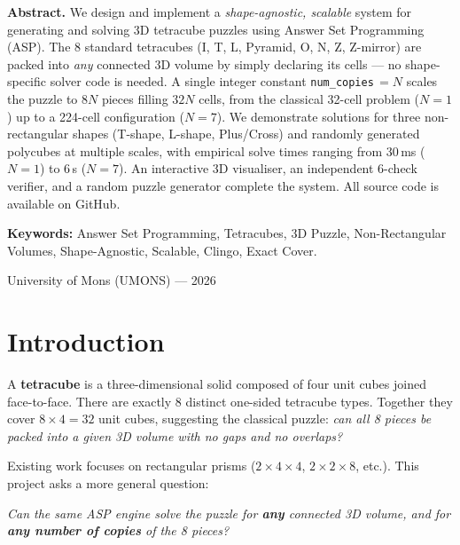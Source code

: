 \documentclass[12pt,a4paper]{article}
\begin{document}
\begin{titlepage}
  \begin{abstractbox}
    \textbf{Abstract.}
    We design and implement a \emph{shape-agnostic, scalable} system for
    generating and solving 3D tetracube puzzles using Answer Set Programming
    (ASP).  The 8 standard tetracubes (I, T, L, Pyramid, O, N, Z, Z-mirror)
    are packed into \emph{any} connected 3D volume by simply declaring its
    cells --- no shape-specific solver code is needed.  A single integer
    constant \texttt{num\_copies}\,$=N$ scales the puzzle to $8N$ pieces
    filling $32N$ cells, from the classical 32-cell problem ($N=1$) up to
    a 224-cell configuration ($N=7$).  We demonstrate solutions for three
    non-rectangular shapes (T-shape, L-shape, Plus/Cross) and randomly
    generated polycubes at multiple scales, with empirical solve times
    ranging from 30\,ms ($N=1$) to 6\,s ($N=7$).  An interactive 3D
    visualiser, an independent 6-check verifier, and a random puzzle
    generator complete the system.  All source code is available on GitHub.

    \vspace{4pt}
    \textbf{Keywords:} Answer Set Programming, Tetracubes, 3D Puzzle,
    Non-Rectangular Volumes, Shape-Agnostic, Scalable, Clingo, Exact Cover.
  \end{abstractbox}

  \vfill
  {\small\color{gray} University of Mons (UMONS) --- 2026}
\end{titlepage}

\tableofcontents
\clearpage

\section{Introduction}

A \textbf{tetracube} is a three-dimensional solid composed of four unit cubes
joined face-to-face.  There are exactly 8 distinct one-sided tetracube types.
Together they cover $8 \times 4 = 32$ unit cubes, suggesting the classical
puzzle: \emph{can all 8 pieces be packed into a given 3D volume with no gaps
and no overlaps?}

Existing work focuses on rectangular prisms ($2\times4\times4$,
$2\times2\times8$, etc.).  This project asks a more general question:

\begin{center}
\emph{Can the same ASP engine solve the puzzle for \textbf{any} connected
3D volume, and for \textbf{any number of copies} of the 8 pieces?}
\end{center}
\end{document}
